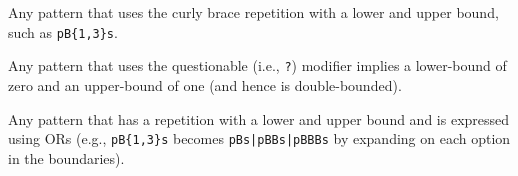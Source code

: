 \begin{description} \itemsep -1pt
\item[D1:] Any pattern that uses the curly brace repetition with a lower and upper bound, such as \verb!pB{1,3}s!.
\item[D2:] Any pattern that uses the questionable (i.e., \verb!?!) modifier implies a lower-bound of zero and an upper-bound of one (and hence is double-bounded).
\item[D3:] Any pattern that has a repetition with a lower and upper bound and is expressed using ORs (e.g., \verb!pB{1,3}s! becomes \verb!pBs|pBBs|pBBBs! by expanding on each option in the boundaries).

\end{description}

